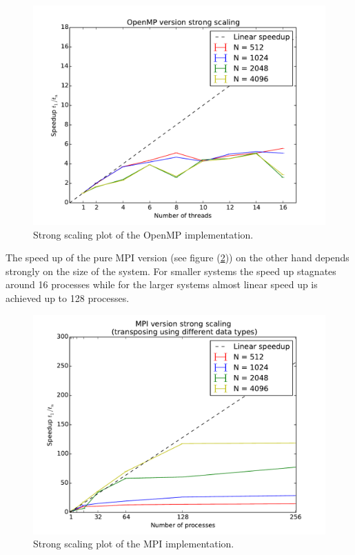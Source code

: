 \documentclass[11pt,a4paper]{article} %
\begin{document}
\begin{figure}
\includegraphics[width=\textwidth]{omp_strong_scaling.pdf}
\caption{Strong scaling plot of the OpenMP implementation.}
\label{fig:omp_strong_scaling}
\end{figure}

The speed up of the pure MPI version (see figure (\ref{fig:mpi_strong_scaling})) on the other hand depends strongly on the size of the system.
For smaller systems the speed up stagnates around 16 processes while for the larger systems almost linear speed up is achieved up to 128 processes. \\

\begin{figure}
\includegraphics[width=\textwidth]{mpi_data_strong_scaling.pdf}
\caption{Strong scaling plot of the MPI implementation.}
\label{fig:mpi_strong_scaling}
\end{figure}
\end{document}
